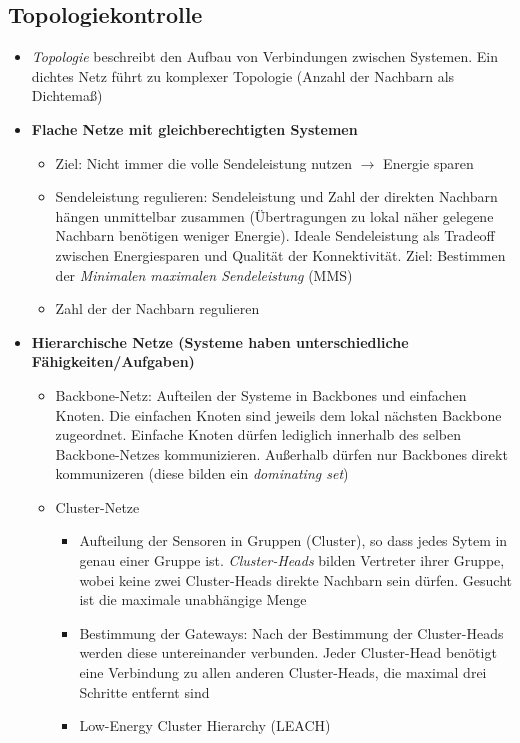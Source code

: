 \subsection{Topologiekontrolle}
\begin{itemize}
	\item \textit{Topologie} beschreibt den Aufbau von Verbindungen zwischen Systemen. Ein dichtes Netz führt zu komplexer Topologie (Anzahl der Nachbarn als Dichtemaß)
	\item \textbf{Flache Netze mit gleichberechtigten Systemen}
	\begin{itemize}
		\item Ziel: Nicht immer die volle Sendeleistung nutzen \(\rightarrow\) Energie sparen
		\item Sendeleistung regulieren: Sendeleistung und Zahl der direkten Nachbarn hängen unmittelbar zusammen (Übertragungen zu lokal näher gelegene Nachbarn benötigen weniger Energie). Ideale Sendeleistung als Tradeoff zwischen Energiesparen und Qualität der Konnektivität. Ziel: Bestimmen der \textit{Minimalen maximalen Sendeleistung} (MMS)
		\item Zahl der der Nachbarn regulieren
	\end{itemize}
	\item \textbf{Hierarchische Netze (Systeme haben unterschiedliche Fähigkeiten/Aufgaben)}
	\begin{itemize}
		\item Backbone-Netz: Aufteilen der Systeme in Backbones und einfachen Knoten. Die einfachen Knoten sind jeweils dem lokal nächsten Backbone zugeordnet. Einfache Knoten dürfen lediglich innerhalb des selben Backbone-Netzes kommunizieren. Außerhalb dürfen nur Backbones direkt kommunizeren (diese bilden ein \textit{dominating set})
		\item Cluster-Netze
		\begin{itemize}
			\item Aufteilung der Sensoren in Gruppen (Cluster), so dass jedes Sytem in genau einer Gruppe ist. \textit{Cluster-Heads} bilden Vertreter ihrer Gruppe, wobei keine zwei Cluster-Heads direkte Nachbarn sein dürfen. Gesucht ist die maximale unabhängige Menge
			\item Bestimmung der Gateways: Nach der Bestimmung der Cluster-Heads werden diese untereinander verbunden. Jeder Cluster-Head benötigt eine Verbindung zu allen anderen Cluster-Heads, die maximal drei Schritte entfernt sind
			\item Low-Energy Cluster Hierarchy (LEACH)
			\begin{itemize}

\end{itemize}
\end{itemize}
\end{itemize}
\end{itemize}
